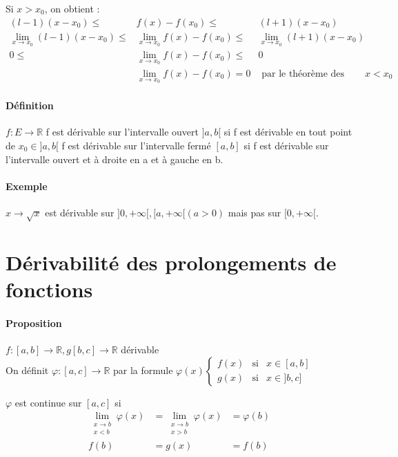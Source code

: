 	Si $x > x_0$, on obtient : \[ \begin{array}{rcl}
			(l-1)(x-x_0) \leq & f(x) - f(x_0) \leq & (l+1)(x-x_0) \\
			\lim_{x \to x_0} (l-1)(x-x_0) \leq & \lim_{x \to x_0}f(x) - f(x_0) \leq & \lim_{x \to x_0}(l+1)(x-x_0) \\
			0 \leq & \lim_{x \to x_0}f(x) - f(x_0) \leq & 0 \\
			  & \lim_{x \to x_0}f(x) - f(x_0) = 0 & \text{ par le théorème des gendarmes, et de même pour } x < x_0 \end{array} \]


\paragraph{Définition} $f:E \rightarrow \mathbb{R}$ 
f est dérivable sur l'intervalle ouvert $]a, b[$ si f est dérivable en tout point de $x_0 \in ]a, b[$
f est dérivable sur l'intervalle fermé $[a, b]$ si f est dérivable sur l'intervalle ouvert et à droite en a et à gauche en b.

\paragraph{Exemple} $x \to \sqrt{x}$ est dérivable sur $]0, +\infty[, [a, +\infty[ (a > 0)$ mais pas sur $[0, +\infty[$.

\section{Dérivabilité des prolongements de fonctions}
\paragraph{Proposition} $f:[a, b] \rightarrow \mathbb{R}, g [b, c] \rightarrow \mathbb{R}$ dérivable ~\\
On définit $\varphi : [a, c] \rightarrow \mathbb{R}$ par la formule $\varphi(x) \left\{ \begin{array}{rcl}
		f(x) & \text{si} & x \in [a, b] \\
		g(x) & \text{si} & x \in ]b, c] 
	\end{array}
	\right.$

	$\varphi $ est continue sur $[a, c]$ si \[\begin{array}{rcl} 
		\lim_{\substack{x \to b \\ x < b}}\varphi (x) &= \lim_{\substack{x \to b \\ x > b}}\varphi (x) &= \varphi(b) \\
		f(b) &= g(x) & = f(b) 
	\end{array}\]

